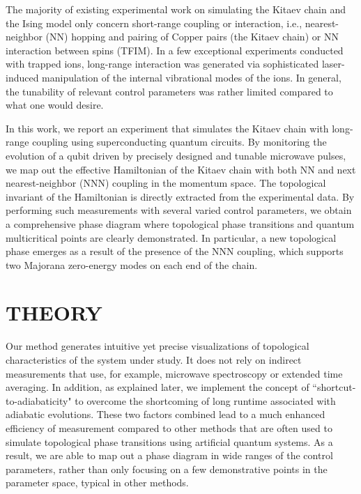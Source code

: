 \documentclass[aps,reprint,groupedaddress,showpacs,superscriptaddress]{revtex4-1}
\begin{document}
The majority of existing experimental work on simulating the Kitaev chain and the Ising model only concern short-range coupling or interaction, i.e., nearest-neighbor (NN) hopping and pairing of Copper pairs (the Kitaev chain) or NN interaction between spins (TFIM). In a few exceptional experiments conducted with trapped ions\cite{Schneider2012,Friedenauer2008,Britton2012,Jurcevic2014,Bermudez2013}, long-range interaction was generated via sophisticated laser-induced manipulation of the internal vibrational modes of the ions. In general, the tunability of relevant control parameters was rather limited compared to what one would desire.

In this work, we report an experiment that simulates the Kitaev chain with long-range coupling using superconducting quantum circuits. By monitoring the evolution of a qubit driven by precisely designed and tunable microwave pulses, we map out the effective Hamiltonian of the Kitaev chain with both NN and next nearest-neighbor (NNN) coupling in the momentum space. The topological invariant of the Hamiltonian is directly extracted from the experimental data. By performing such measurements with several varied control parameters, we obtain a comprehensive phase diagram where topological phase transitions and quantum multicritical points are clearly demonstrated. In particular, a new topological phase emerges as a result of the presence of the NNN coupling, which supports two Majorana zero-energy modes on each end of the chain. 

\section{THEORY}
Our method generates intuitive yet precise visualizations of topological characteristics of the system under study. It does not rely on indirect measurements that use, for example, microwave spectroscopy or extended time averaging. In addition, as explained later, we implement the concept of ``shortcut-to-adiabaticity" to overcome the shortcoming of long runtime associated with adiabatic evolutions. These two factors combined lead to a much enhanced efficiency of measurement compared to other methods that are often used to simulate topological phase transitions using artificial quantum systems. As a result, we are able to map out a phase diagram in wide ranges of the control parameters, rather than only focusing on a few demonstrative points in the parameter space, typical in other methods. 
\end{document}
